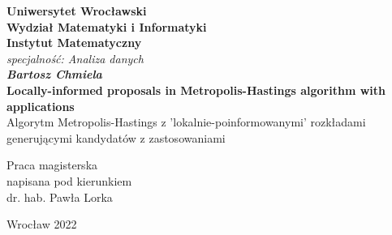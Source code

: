 \thispagestyle{empty}
\begin{center}
	\textbf{\large Uniwersytet Wroc\l{}awski\\
		Wydzia\l{} Matematyki i Informatyki\\
		Instytut Matematyczny}\\
	\textit{\large specjalno\'{s}\'{c}: Analiza danych}\\
	\vspace{4cm}
	\textbf{\textit{\large Bartosz Chmiela}\\
		\vspace{0.5cm}
		{\Large Locally-informed proposals in Metropolis-Hastings algorithm with applications}}\\
		\vspace{0.5cm}
		Algorytm Metropolis-Hastings z 'lokalnie-poinformowanymi' rozkładami generującymi kandydatów z zastosowaniami
\end{center}
\vspace{3cm}
{\large \hspace*{6.5cm}Praca magisterska\\
	\hspace*{6.5cm}napisana pod kierunkiem\\
	\hspace*{6.5cm}dr. hab. Paw\l{}a Lorka }\\
\vfill
\begin{center}
	{\large Wroc\l{}aw 2022}\\
\end{center}